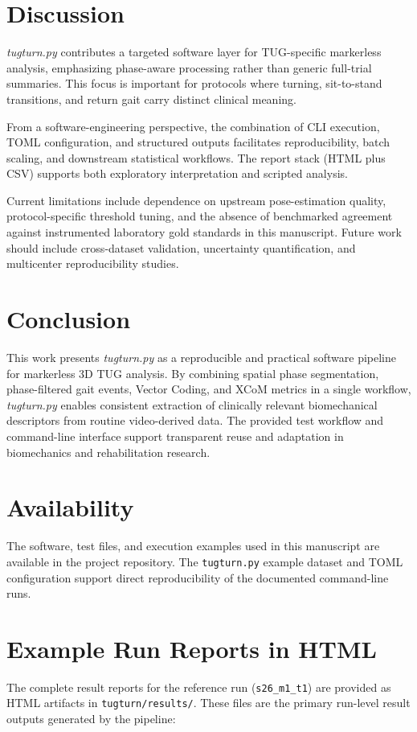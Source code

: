 \documentclass{article}
\begin{document}
\section{Discussion}
\textit{tugturn.py} contributes a targeted software layer for TUG-specific markerless analysis, emphasizing phase-aware processing rather than generic full-trial summaries. This focus is important for protocols where turning, sit-to-stand transitions, and return gait carry distinct clinical meaning.

From a software-engineering perspective, the combination of CLI execution, TOML configuration, and structured outputs facilitates reproducibility, batch scaling, and downstream statistical workflows. The report stack (HTML plus CSV) supports both exploratory interpretation and scripted analysis.

Current limitations include dependence on upstream pose-estimation quality, protocol-specific threshold tuning, and the absence of benchmarked agreement against instrumented laboratory gold standards in this manuscript. Future work should include cross-dataset validation, uncertainty quantification, and multicenter reproducibility studies.

\section{Conclusion}
This work presents \textit{tugturn.py} as a reproducible and practical software pipeline for markerless 3D TUG analysis. By combining spatial phase segmentation, phase-filtered gait events, Vector Coding, and XCoM metrics in a single workflow, \textit{tugturn.py} enables consistent extraction of clinically relevant biomechanical descriptors from routine video-derived data. The provided test workflow and command-line interface support transparent reuse and adaptation in biomechanics and rehabilitation research.

\section*{Availability}
The software, test files, and execution examples used in this manuscript are available in the project repository. The \texttt{tugturn.py} example dataset and TOML configuration support direct reproducibility of the documented command-line runs.

\appendix
\section{Example Run Reports in HTML}
The complete result reports for the reference run (\texttt{s26\_m1\_t1}) are provided as HTML artifacts in
\texttt{tugturn/results/}. These files are the primary run-level result outputs generated by the pipeline:
\end{document}
